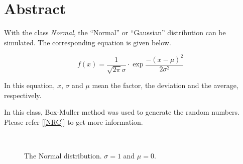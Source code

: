 %

\section{Abstract}

\noindent
With the class {\em Normal}, the ``Normal'' or ``Gaussian''
distribution can be simulated. The corresponding equation is given below.

\begin{equation}
f(x) = \frac{1}{\sqrt{2\pi}\sigma} \cdot \exp{\frac{-(x-\mu)^2}{2\sigma^2}}
\end{equation}

\noindent
In this equation, $x$, $\sigma$ and $\mu$ mean the factor, the deviation
and the average, respectively.

\noindent
In this class, Box-Muller method was used to generate the random
numbers. Please refer [\ref{NRC}] to get more information.


\vspace*{10mm}

\begin{center}
\begin{figure}[h]
\\
\caption{The Normal distribution. $\sigma=1$ and $\mu=0$.}
\end{figure}
\end{center}

